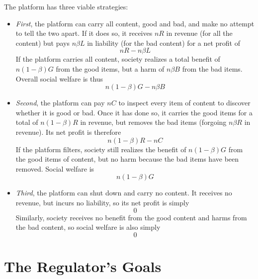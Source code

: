 \documentclass[openbib,12pt]{article}  %
\begin{document}
The platform has three viable strategies:
\begin{itemize}

\item  \emph{First}, the platform can carry all content, good and bad, and make no attempt to tell the two apart. If it does so, it receives $nR$ in revenue (for all the content) but pays $n\beta L$ in liability (for the bad content) for a net profit of
\begin{equation}
\label{profitnofilter}
nR - n\beta L
\end{equation}
If the platform carries all content, society realizes a total benefit of $n(1-\beta)G$ from the good items, but a harm of $n\beta B$ from the bad items. Overall social welfare is thus
\begin{equation}
\label{welfarenofilter}
n(1-\beta)G - n \beta B
\end{equation}

\item \emph{Second}, the platform can pay $nC$ to inspect every item of content to discover whether it is good or bad. Once it has done so, it carries the good items for a total of $n(1-\beta)R$ in revenue, but removes the bad items (forgoing $n\beta R$ in revenue). Its net profit is therefore 
\begin{equation}
\label{profitfilter}
n(1 - \beta)R - nC    
\end{equation}
If the platform filters, society still realizes the benefit of  $n(1-\beta)G$ from the good items of content, but no harm because the bad items have been removed. Social welfare is
\begin{equation}
\label{welfarefilter}
n(1-\beta)G
\end{equation}

\item \emph{Third}, the platform can shut down and carry no content. It receives no revenue, but incurs no liability, so its net profit is simply
\begin{equation}
\label{profitshutdown}
0  
\end{equation}
Similarly, society receives no benefit from the good content and harms from the bad content, so social welfare is also simply 
\begin{equation}
\label{welfareshutdown}
0  
\end{equation}
\end{itemize}

\section{The Regulator's Goals}
\end{document}
